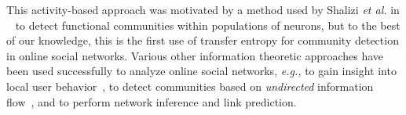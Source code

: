 

This activity-based approach was motivated by a method used by Shalizi \emph{et al.} in ~\cite{shalizi2007discovering} to detect functional communities within populations of neurons, but to the best of our knowledge, this is the first use of transfer entropy for community detection in online social networks. Various other information theoretic approaches have been used successfully to analyze online social networks, \emph{e.g.,} to gain insight into local user behavior~\cite{darmon2013understanding}, to detect communities based on \emph{undirected} information flow~\cite{darmon2013detecting}, and to perform network inference and link prediction\cite{ver2012information}.



